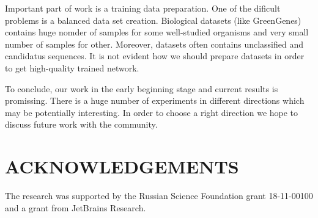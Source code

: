 \documentclass[a4paper,twoside]{article}
\begin{document}
Important part of work is a training data preparation.
One of the dificult problems is a balanced data set creation.
Biological datasets (like GreenGenes) contains huge nomder of samples for some well-studied organisms and very small number of samples for other.
Moreover, datasets often contains unclassified and candidatus sequences.
It is not evident how  we should prepare datasets in order to get high-quality trained network.

To conclude, our work in the early beginning stage and current results is promissing. 
There is a huge number of experiments in different directions which may be potentially interesting.
In order to choose a right direction we hope to discuss future work with the community.


\section*{\uppercase{Acknowledgements}}

\noindent The research was supported by the Russian Science Foundation grant 18-11-00100 and a grant from JetBrains Research.




{\small
}


\vfill
\end{document}
